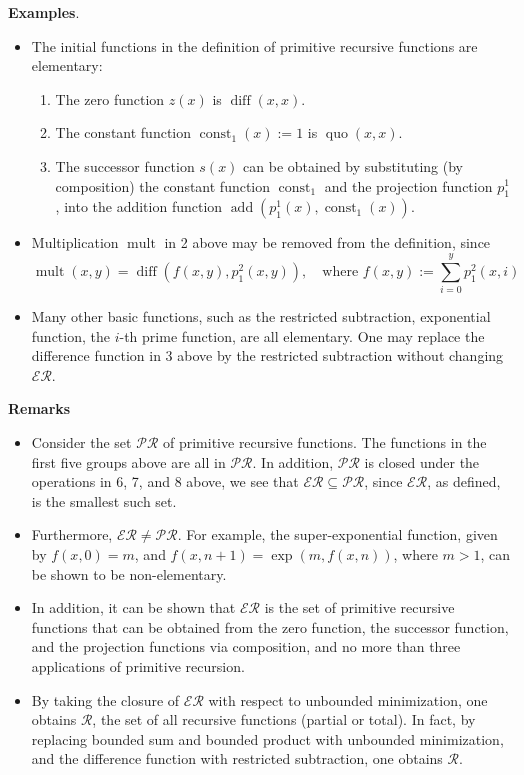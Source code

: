 \documentclass[12pt]{article}
\begin{document}
\textbf{Examples}.  
\begin{itemize}
\item The initial functions in the definition of primitive recursive functions are elementary:
\begin{enumerate}
\item The zero function $z(x)$ is $\operatorname{diff}(x,x)$.  
\item The constant function $\operatorname{const}_1(x):=1$ is $\operatorname{quo}(x,x)$.
\item The successor function $s(x)$ can be obtained by substituting (by composition) the constant function $\operatorname{const}_1$ and the projection function $p_1^1$, into the addition function $\operatorname{add}(p_1^1(x),\operatorname{const}_1(x))$.
\end{enumerate}
\item Multiplication $\operatorname{mult}$ in 2 above may be removed from the definition, since
$$\operatorname{mult}(x,y)= \operatorname{diff}(f(x,y), p_1^2(x,y)),\quad \mbox{where }f(x,y):=\sum_{i=0}^y p_1^2(x,i)$$
\item
Many other basic functions, such as the restricted subtraction, exponential function, the $i$-th prime function, are all elementary.  One may replace the difference function in 3 above by the restricted subtraction without changing $\mathcal{ER}$.
\end{itemize}

\textbf{Remarks}
\begin{itemize}
\item Consider the set $\mathcal{PR}$ of primitive recursive functions.  The functions in the first five groups above are all in $\mathcal{PR}$.  In addition, $\mathcal{PR}$ is closed under the operations in 6, 7, and 8 above, we see that $\mathcal{ER}\subseteq \mathcal{PR}$, since $\mathcal{ER}$, as defined, is the smallest such set.
\item Furthermore, $\mathcal{ER}\ne \mathcal{PR}$.  For example, the super-exponential function, given by $f(x,0)=m$, and $f(x,n+1)=\exp(m,f(x,n))$, where $m > 1$, can be shown to be non-elementary.
\item In addition, it can be shown that $\mathcal{ER}$ is the set of primitive recursive functions that can be obtained from the zero function, the successor function, and the projection functions via composition, and no more than three applications of primitive recursion.
\item By taking the closure of $\mathcal{ER}$ with respect to unbounded minimization, one obtains $\mathcal{R}$, the set of all recursive functions (partial or total).  In fact, by replacing bounded sum and bounded product with unbounded minimization, and the difference function with restricted subtraction, one obtains $\mathcal{R}$.
\end{itemize}
\end{document}
